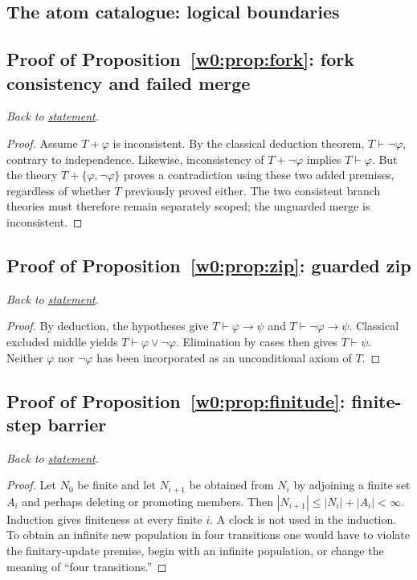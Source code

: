\documentclass[11pt,letterpaper]{article}
\theoremstyle{definition}\newtheorem{definition}[theorem]{Definition}\newtheorem{example}[theorem]{Example}
\theoremstyle{remark}\newtheorem{remark}[theorem]{Remark}
\begin{document}
\subsection*{The atom catalogue: logical boundaries}

\subsection{Proof of Proposition~\ref{w0:prop:fork}: fork consistency and failed merge}\label{w0:pr:fork}
\textit{Back to \hyperref[w0:prop:fork]{statement}.}
\begin{proof}
Assume $T+\varphi$ is inconsistent. By the classical deduction theorem, $T\vdash\neg\varphi$, contrary to independence. Likewise, inconsistency of $T+\neg\varphi$ implies $T\vdash\varphi$. But the theory $T+\{\varphi,\neg\varphi\}$ proves a contradiction using these two added premises, regardless of whether $T$ previously proved either. The two consistent branch theories must therefore remain separately scoped; the unguarded merge is inconsistent.
\end{proof}

\subsection{Proof of Proposition~\ref{w0:prop:zip}: guarded zip}\label{w0:pr:zip}
\textit{Back to \hyperref[w0:prop:zip]{statement}.}
\begin{proof}
By deduction, the hypotheses give $T\vdash\varphi\to\psi$ and $T\vdash\neg\varphi\to\psi$. Classical excluded middle yields $T\vdash\varphi\lor\neg\varphi$. Elimination by cases then gives $T\vdash\psi$. Neither $\varphi$ nor $\neg\varphi$ has been incorporated as an unconditional axiom of $T$.
\end{proof}

\subsection{Proof of Proposition~\ref{w0:prop:finitude}: finite-step barrier}\label{w0:pr:finitude}
\textit{Back to \hyperref[w0:prop:finitude]{statement}.}
\begin{proof}
Let $N_0$ be finite and let $N_{i+1}$ be obtained from $N_i$ by adjoining a finite set $A_i$ and perhaps deleting or promoting members. Then $|N_{i+1}|\le |N_i|+|A_i|<\infty$. Induction gives finiteness at every finite $i$. A clock is not used in the induction. To obtain an infinite new population in four transitions one would have to violate the finitary-update premise, begin with an infinite population, or change the meaning of ``four transitions.''
\end{proof}
\end{document}
